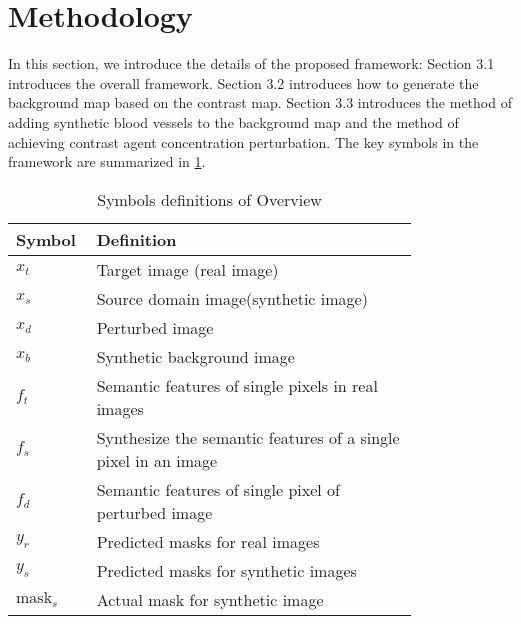 \section{Methodology}
\label{sec:intro}

In this section, we introduce the details of the proposed framework: Section 3.1 introduces the overall framework. Section 3.2 introduces how to generate the background map based on the contrast map. Section 3.3 introduces the method of adding synthetic blood vessels to the background map and the method of achieving contrast agent concentration perturbation. 
The key symbols in the framework are summarized in \cref{tab:myT01}.


\begin{table}
   \centering
   \begin{tabular}{@{}lp{0.8\linewidth}@{}}
      \toprule
      \textbf{Symbol} & \textbf{Definition} \\ \midrule
      $x_t$ & Target image (real image) \\
      $x_s$ & Source domain image(synthetic image) \\
      $x_d$ & Perturbed image \\
      $x_b$ & Synthetic background image \\
      $f_t$ & Semantic features of single pixels in real images \\
      $f_s$ & Synthesize the semantic features of a single pixel in an image \\
      $f_d$ & Semantic features of single pixel of perturbed image \\
      $y_r$ & Predicted masks for real images \\
      $y_s$ & Predicted masks for synthetic images \\
      $\text{mask}_s$ & Actual mask for synthetic image \\ \bottomrule
      \end{tabular}
   \caption{Symbols definitions of Overview}
   \label{tab:myT01}
 \end{table}